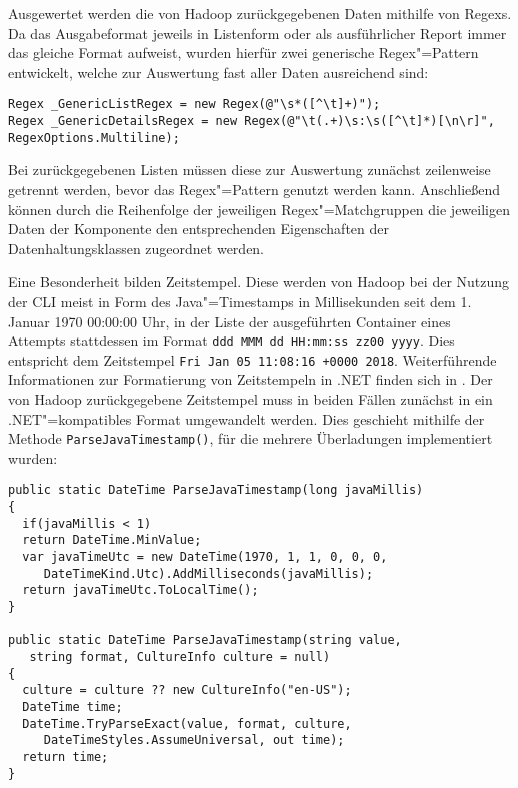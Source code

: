 Ausgewertet werden die von Hadoop zurückgegebenen Daten mithilfe von \acp{Regex}.
Da das Ausgabeformat jeweils in Listenform oder als ausführlicher Report immer das gleiche Format aufweist, wurden hierfür zwei generische Regex"=Pattern entwickelt, welche zur Auswertung fast aller Daten ausreichend sind:

\begin{lstlisting}[label=lst:cmdRegexPattern,style=cs,
caption={[Implementierte \acs{Regex}"=Pattern im CmdParser]
    Implementierte \acs{Regex}"=Pattern im \texttt{CmdParser}}]
Regex _GenericListRegex = new Regex(@"\s*([^\t]+)");
Regex _GenericDetailsRegex = new Regex(@"\t(.+)\s:\s([^\t]*)[\n\r]", RegexOptions.Multiline);
\end{lstlisting}

Bei zurückgegebenen Listen müssen diese zur Auswertung zunächst zeilenweise getrennt werden, bevor das Regex"=Pattern genutzt werden kann.
Anschließend können durch die Reihenfolge der jeweiligen Regex"=Matchgruppen die jeweiligen Daten der Komponente den entsprechenden Eigenschaften der Datenhaltungsklassen zugeordnet werden.

Eine Besonderheit bilden Zeitstempel.
Diese werden von Hadoop bei der Nutzung der \ac{CLI} meist in Form des Java"=Timestamps in Millisekunden seit dem 1. Januar 1970 00:00:00 Uhr, in der Liste der ausgeführten Container eines Attempts stattdessen im Format \texttt{ddd MMM dd HH:mm:ss zz00 yyyy}.
Dies entspricht \zB dem Zeitstempel \texttt{Fri Jan 05 11:08:16 +0000 2018}.
Weiterführende Informationen zur Formatierung von Zeitstempeln in .NET finden sich in \cite{CsTimeFormatStrings}.
Der von Hadoop zurückgegebene Zeitstempel muss in beiden Fällen zunächst in ein .NET"=kompatibles Format umgewandelt werden.
Dies geschieht mithilfe der Methode \texttt{ParseJavaTimestamp()}, für die mehrere Überladungen implementiert wurden:

\begin{lstlisting}[label=lst:parseJavaTimestamp,style=cs,
caption={[Überladungen der Methode ParseJavaTimestamp()]
    Überladungen der Methode \texttt{ParseJavaTimestamp()}.
    Es steht zudem eine weitere Überladung zur Verfügung, um den Timestamp in Form der Millisekunden seit 1970 als \texttt{string} zu übergeben.
    Dabei wird der \texttt{string} in einen \texttt{long} konvertiert und anschließend die erste hier gezeigte Überladung aufgerufen.}]
public static DateTime ParseJavaTimestamp(long javaMillis)
{
  if(javaMillis < 1)
  return DateTime.MinValue;
  var javaTimeUtc = new DateTime(1970, 1, 1, 0, 0, 0,
     DateTimeKind.Utc).AddMilliseconds(javaMillis);
  return javaTimeUtc.ToLocalTime();
}

public static DateTime ParseJavaTimestamp(string value,
   string format, CultureInfo culture = null)
{
  culture = culture ?? new CultureInfo("en-US");
  DateTime time;
  DateTime.TryParseExact(value, format, culture,
     DateTimeStyles.AssumeUniversal, out time);
  return time;
}
\end{lstlisting}

